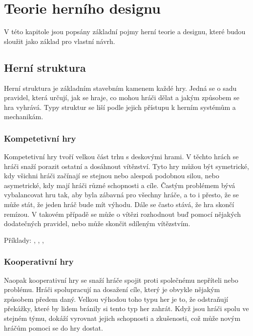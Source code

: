 \chapter{Teorie herního designu}
\label{chap:game_design}

V této kapitole jsou popsány základní pojmy herní teorie a designu, které budou sloužit jako základ pro vlastní návrh. \cite{building_blocks_of_tabletop_design_2022}



\section{Herní struktura}
\label{sec:structure}

Herní struktura je základním stavebním kamenem každé hry. Jedná se o sadu pravidel, která určují, jak se hraje, co mohou hráči dělat a jakým způsobem se hra vyhrává. Typy struktur se liší podle jejich přístupu k herním systémům a mechanikám. 

\subsection{Kompetetivní hry}
\label{subsec:structure_competitive}

Kompetetivní hry tvoří velkou část trhu s deskovými hrami. V těchto hrách se hráči snaží porazit ostatní a dosáhnout vítězství. Tyto hry můžou být symetrické, kdy všichni hráči začínají se stejnou nebo alespoň podobnou silou, nebo asymetrické, kdy mají hráči různé schopnosti a cíle. Častým problémem bývá vybalancovat hru tak, aby byla zábavná pro všechny hráče, a to i přesto, že se může stát, že jeden hráč bude mít výhodu. Dále se často stává, že hra skončí remízou. V takovém případě se může o vítězi rozhodnout buď pomocí nějakých dodatečných pravidel, nebo může skončit sdíleným vítězstvím.

Příklady: , , , 

\subsection{Kooperativní hry}
\label{subsec:structure_cooperative}

Naopak kooperativní hry se snaží hráče spojit proti společnému nepříteli nebo problému. Hráči spolupracují na dosažení cíle, který je obvykle nějakým způsobem předem daný. Velkou výhodou toho typu her je to, že odstraňují překážky, které by lidem bránily si tento typ her zahrát. Když jsou hráči spolu ve stejném týmu, dokáží vyrovnat jejich schopnosti a zkušenosti, což může novým hráčům pomoci se do hry dostat.

